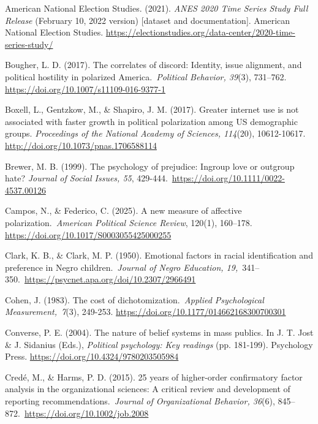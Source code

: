 \documentclass[authordate, meta, issue]{jote-new-article}
\begin{document}
	American National Election Studies. (2021). \emph{ANES 2020 Time Series Study Full Release} (February 10, 2022 version) [dataset and documentation]. American National Election Studies. \url{https://electionstudies.org/data-center/2020-time-series-study/}



	Bougher, L. D. (2017). The correlates of discord: Identity, issue alignment, and political hostility in polarized America. \emph{Political Behavior, 39}(3), 731--762. \url{https://doi.org/10.1007/s11109-016-9377-1}



	Boxell, L., Gentzkow, M., \& Shapiro, J. M. (2017). Greater internet use is not associated with faster growth in political polarization among US demographic groups. \emph{Proceedings of the National Academy of Sciences, 114}(20), 10612-10617. \url{http://doi.org/10.1073/pnas.1706588114}



	Brewer, M. B. (1999). The psychology of prejudice: Ingroup love or outgroup hate? \emph{Journal of Social Issues, 55}, 429-444. \url{https://doi.org/10.1111/0022-4537.00126}



	Campos, N., \& Federico, C. (2025). A new measure of affective polarization. \emph{American Political Science Review}, 120(1), 160--178. \url{https://doi.org/10.1017/S0003055425000255}



	Clark, K. B., \& Clark, M. P. (1950). Emotional factors in racial identification and preference in Negro children. \emph{Journal of Negro Education, 19,} 341--350. \url{https://psycnet.apa.org/doi/10.2307/2966491}



	Cohen, J. (1983). The cost of dichotomization.\emph{ Applied Psychological Measurement, 7}(3), 249-253. \url{https://doi.org/10.1177/014662168300700301}



	Converse, P. E. (2004). The nature of belief systems in mass publics. In J. T. Jost \& J. Sidanius (Eds.), \emph{Political psychology: Key readings} (pp. 181-199). Psychology Press. \url{https://doi.org/10.4324/9780203505984}



	Credé, M., \& Harms, P. D. (2015). 25 years of higher-order confirmatory factor analysis in the organizational sciences: A critical review and development of reporting recommendations. \emph{Journal of Organizational Behavior, 36}(6), 845--872. \url{https://doi.org/10.1002/job.2008}
\end{document}
